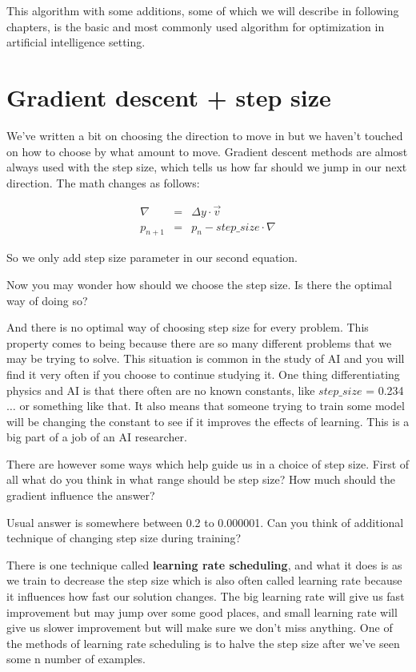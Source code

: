 This algorithm with some additions, some of which we will describe in following chapters, is the basic and most commonly used algorithm for optimization in artificial intelligence setting.


\section{ Gradient descent + step size}

We’ve written a bit on choosing the direction to move in but we haven’t touched on how to choose by what amount to move. Gradient descent methods are almost always used with the step size, which tells us how far should we jump in our next direction. The math changes as follows:

\begin{eqnarray}
	\nabla &=& \Delta y \cdot \vec{v}\\
	p_{n+1} &=& p_n - step\_size \cdot \nabla
\end{eqnarray}


So we only add step size parameter in our second equation.

Now you may wonder how should we choose the step size. Is there the optimal way of doing so?


And there is no optimal way of choosing step size for every problem. This property comes to being because there are so many different problems that we may be trying to solve. This situation is common in the study of AI and you will find it very often if you choose to continue studying it. One thing differentiating physics and AI is that there often are no known constants, like $step\_size$ = 0.234$\ldots$ or something like that. It also means that someone trying to train some model will be changing the constant to see if it improves the effects of learning. This is a big part of a job of an AI researcher.

There are however some ways which help guide us in a choice of step size. First of all what do you think in what range should be step size? How much should the gradient influence the answer?

Usual answer is somewhere between 0.2 to 0.000001. Can you think of additional technique of changing step size during training?

There is one technique called \textbf{learning rate scheduling}, and what it does is as we train to decrease the step size which is also often called learning rate because it influences how fast our solution changes. The big learning rate will give us fast improvement but may jump over some good places, and small learning rate will give us slower improvement but will make sure we don’t miss anything. One of the methods of learning rate scheduling is to halve the step size after we’ve seen some n number of examples.

